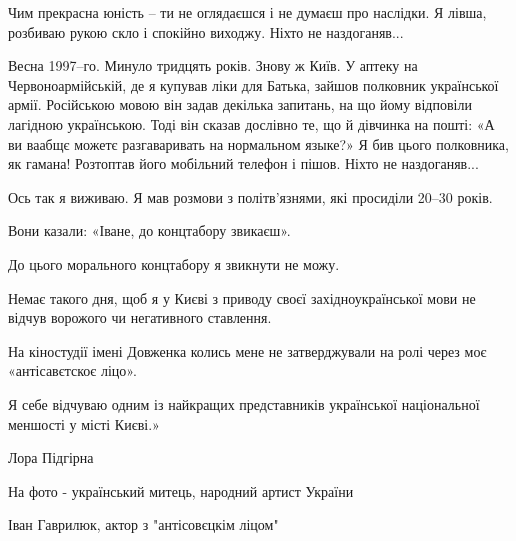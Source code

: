 Чим прекрасна юність – ти не оглядаєшся і не думаєш про наслідки. Я лівша,
розбиваю рукою скло і спокійно виходжу. Ніхто не наздоганяв...

Весна 1997–го. Минуло тридцять років. Знову ж Київ. У аптеку на
Червоноармійській, де я купував ліки для Батька, зайшов полковник української
армії. Російською мовою він задав декілька запитань, на що йому відповіли
лагідною українською. Тоді він сказав дослівно те, що й дівчинка на пошті: «А
ви ваабщє можетє разгаваривать на нормальном языке?» Я бив цього полковника, як
гамана! Розтоптав його мобільний телефон і пішов. Ніхто не наздоганяв...

Ось так я виживаю. Я мав розмови з політв’язнями, які просиділи 20–30 років.

Вони казали: «Іване, до концтабору звикаєш».

До цього морального концтабору я звикнути не можу.

Немає такого дня, щоб я у Києві з приводу своєї західноукраїнської мови не
відчув ворожого чи негативного ставлення.

На кіностудії імені Довженка колись мене не затверджували на ролі через моє
«антісавєтскоє ліцо».

Я себе відчуваю одним із найкращих представників української національної
меншості у місті Києві.»

Лора Підгірна

На фото - український митець, народний артист України

Іван Гаврилюк, актор з "антісовєцкім ліцом"

